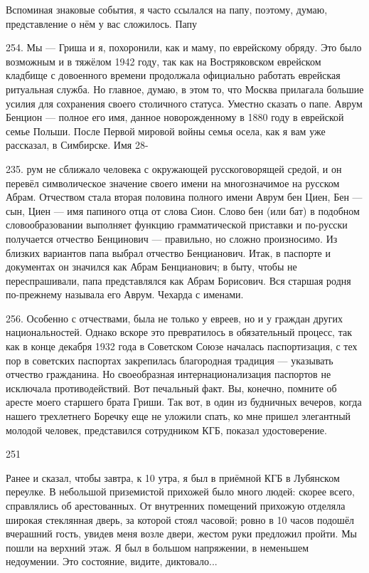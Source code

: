 

Вспоминая знаковые события, я часто ссылался на папу, поэтому, думаю, представление о нём у вас сложилось. Папу

254. Мы — Гриша и я, похоронили, как и маму, по еврейскому обряду. Это было возможным и в тяжёлом 1942 году, так как на Востряковском еврейском кладбище с довоенного времени продолжала официально работать еврейская ритуальная служба. Но главное, думаю, в этом то, что Москва прилагала большие усилия для сохранения своего столичного статуса. Уместно сказать о папе. Аврум Бенцион — полное его имя, данное новорожденному в 1880 году в еврейской семье Польши. После Первой мировой войны семья осела, как я вам уже рассказал, в Симбирске. Имя 28-

235.
рум не сближало человека с окружающей русскоговорящей средой, и он перевёл символическое значение своего имени на многозначимое на русском Абрам. Отчеством стала вторая половина полного имени Аврум бен Циен, Бен — сын, Циен — имя папиного отца от слова Сион. Слово бен (или бат) в подобном словообразовании выполняет функцию грамматической приставки и по-русски получается отчество Бенцинович — правильно, но сложно произносимо. Из близких вариантов папа выбрал отчество Бенцианович.
Итак, в паспорте и документах он значился как Абрам Бенцианович; в быту, чтобы не переспрашивали, папа представлялся как Абрам Борисович. Вся старшая родня по-прежнему называла его Аврум. Чехарда с именами.

256. Особенно с отчествами, была не только у евреев, но и у граждан других национальностей. Однако вскоре это превратилось в обязательный процесс, так как в конце декабря 1932 года в Советском Союзе началась паспортизация, с тех пор в советских паспортах закрепилась благородная традиция — указывать отчество гражданина. Но своеобразная интернационализация паспортов не исключала противодействий. Вот печальный факт. Вы, конечно, помните об аресте моего старшего брата Гриши. Так вот, в один из будничных вечеров, когда нашего трехлетнего Боречку еще не уложили спать, ко мне пришел элегантный молодой человек, представился сотрудником КГБ, показал удостоверение.

251

Ранее и сказал, чтобы завтра, к 10 утра, я был в приёмной КГБ в Лубянском переулке. В небольшой приземистой прихожей было много людей: скорее всего, справлялись об арестованных. От внутренних помещений прихожую отделяла широкая стеклянная дверь, за которой стоял часовой; ровно в 10 часов подошёл вчерашний гость, увидев меня возле двери, жестом руки предложил пройти. Мы пошли на верхний этаж. Я был в большом напряжении, в неменьшем недоумении. Это состояние, видите, диктовало...

